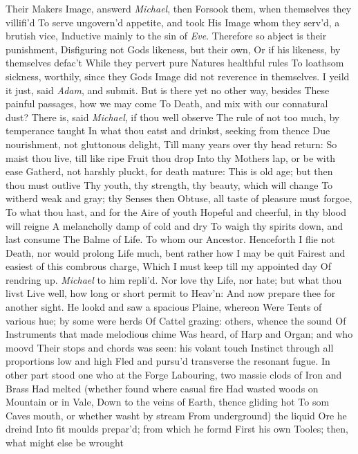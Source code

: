 \documentclass[11pt]{book}
\newcounter {last}
\begin{document}
\quad Their Makers Image, answerd \textit{Michael}, then 
Forsook them, when themselves they villifi'd 
To serve ungovern'd appetite, and took 
His Image whom they serv'd, a brutish vice, 
Inductive mainly to the sin of \textit{Eve}. 
Therefore so abject is their punishment, 
Disfiguring not Gods likeness, but their own, 
Or if his likeness, by themselves defac't 
While they pervert pure Natures healthful rules 
To loathsom sickness, worthily, since they 
Gods Image did not reverence in themselves. 
\quad I yeild it just, said \textit{Adam}, and submit. 
But is there yet no other way, besides 
These painful passages, how we may come 
To Death, and mix with our connatural dust? 
\quad There is, said \textit{Michael}, if thou well observe 
The rule of not too much, by temperance taught 
In what thou eatst and drinkst, seeking from thence 
Due nourishment, not gluttonous delight, 
Till many years over thy head return: 
So maist thou live, till like ripe Fruit thou drop 
Into thy Mothers lap, or be with ease 
Gatherd, not harshly pluckt, for death mature: 
This is old age; but then thou must outlive 
Thy youth, thy strength, thy beauty, which will change 
To witherd weak and gray; thy Senses then 
Obtuse, all taste of pleasure must forgoe, 
To what thou hast, and for the Aire of youth 
Hopeful and cheerful, in thy blood will reigne 
A melancholly damp of cold and dry 
To waigh thy spirits down, and last consume 
The Balme of Life.  To whom our Ancestor. 
\quad Henceforth I flie not Death, nor would prolong 
Life much, bent rather how I may be quit 
Fairest and easiest of this combrous charge, 
Which I must keep till my appointed day 
Of rendring up.  \textit{Michael} to him repli'd. 
\quad Nor love thy Life, nor hate; but what thou livst 
Live well, how long or short permit to Heav'n: 
And now prepare thee for another sight. 
\quad He lookd and saw a spacious Plaine, whereon 
Were Tents of various hue; by some were herds 
Of Cattel grazing: others, whence the sound 
Of Instruments that made melodious chime 
Was heard, of Harp and Organ; and who moovd 
Their stops and chords was seen: his volant touch 
Instinct through all proportions low and high 
Fled and pursu'd transverse the resonant fugue. 
In other part stood one who at the Forge 
Labouring, two massie clods of Iron and Brass 
Had melted (whether found where casual fire 
Had wasted woods on Mountain or in Vale, 
Down to the veins of Earth, thence gliding hot 
To som Caves mouth, or whether washt by stream 
From underground) the liquid Ore he dreind 
Into fit moulds prepar'd; from which he formd 
First his own Tooles; then, what might else be wrought 
\end{document}
